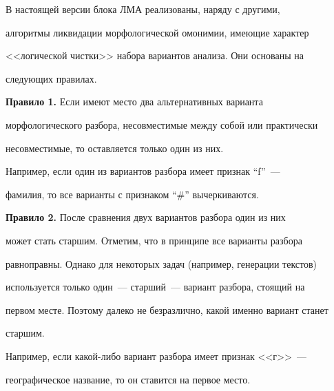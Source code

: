    


   В настоящей версии блока ЛМА реализованы, наряду с другими, 


алгоритмы ликвидации морфологической омонимии, имеющие характер 


<<логической чистки>> набора вариантов анализа. Они основаны на 


следующих правилах.


   


   \smallskip


   


   \noindent


   \textbf{Правило 1.} Если имеют место два альтернативных варианта 


морфологического разбора, несовместимые между собой или практически 


несовместимые, то оставляется только один из них. 


   


   Например, если один из вариантов разбора имеет признак ``f''~--- 


фамилия, то все варианты с признаком ``\#''  вычеркиваются. 


   


   


   \smallskip


   


   \noindent


   \textbf{Правило 2.} После сравнения двух вариантов разбора один из них 


может стать старшим. Отметим, что в принципе все варианты разбора 


равноправны. Однако для некоторых задач (например, генерации текстов)  


используется только один~--- старший~--- вариант разбора, стоящий на 


первом месте. Поэтому далеко не безразлично, какой именно вариант станет 


старшим.


   


   Например, если какой-либо вариант разбора имеет признак <<г>>~--- 


географическое название, то он ставится на первое место.


